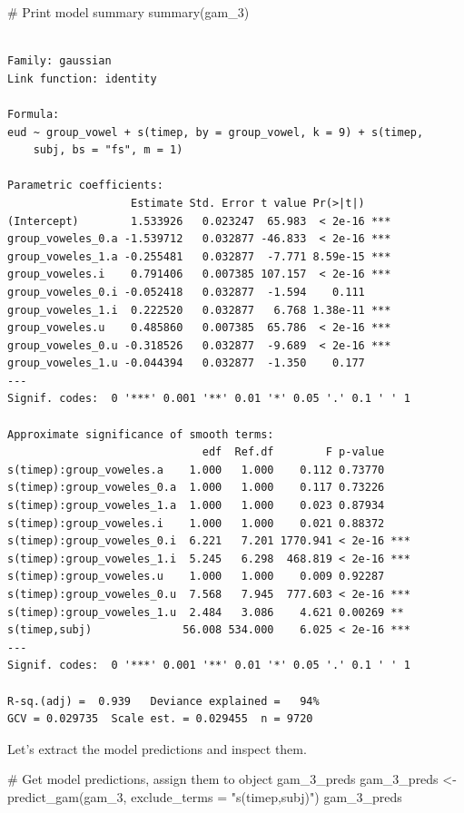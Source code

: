 \documentclass[
  letterpaper,
  DIV=11,
  numbers=noendperiod]{scrartcl}
\newenvironment{Shaded}{\begin{snugshade}}{\end{snugshade}}
\newcommand{\AttributeTok}[1]{\textcolor[rgb]{0.40,0.45,0.13}{#1}}
\newcommand{\CommentTok}[1]{\textcolor[rgb]{0.37,0.37,0.37}{#1}}
\newcommand{\FunctionTok}[1]{\textcolor[rgb]{0.28,0.35,0.67}{#1}}
\newcommand{\NormalTok}[1]{\textcolor[rgb]{0.00,0.23,0.31}{#1}}
\newcommand{\OtherTok}[1]{\textcolor[rgb]{0.00,0.23,0.31}{#1}}
\newcommand{\StringTok}[1]{\textcolor[rgb]{0.13,0.47,0.30}{#1}}
\begin{document}
\begin{Shaded}
\begin{Highlighting}[]
\CommentTok{\# Print model summary}
\FunctionTok{summary}\NormalTok{(gam\_3)}
\end{Highlighting}
\end{Shaded}

\begin{verbatim}

Family: gaussian 
Link function: identity 

Formula:
eud ~ group_vowel + s(timep, by = group_vowel, k = 9) + s(timep, 
    subj, bs = "fs", m = 1)

Parametric coefficients:
                   Estimate Std. Error t value Pr(>|t|)    
(Intercept)        1.533926   0.023247  65.983  < 2e-16 ***
group_voweles_0.a -1.539712   0.032877 -46.833  < 2e-16 ***
group_voweles_1.a -0.255481   0.032877  -7.771 8.59e-15 ***
group_voweles.i    0.791406   0.007385 107.157  < 2e-16 ***
group_voweles_0.i -0.052418   0.032877  -1.594    0.111    
group_voweles_1.i  0.222520   0.032877   6.768 1.38e-11 ***
group_voweles.u    0.485860   0.007385  65.786  < 2e-16 ***
group_voweles_0.u -0.318526   0.032877  -9.689  < 2e-16 ***
group_voweles_1.u -0.044394   0.032877  -1.350    0.177    
---
Signif. codes:  0 '***' 0.001 '**' 0.01 '*' 0.05 '.' 0.1 ' ' 1

Approximate significance of smooth terms:
                              edf  Ref.df        F p-value    
s(timep):group_voweles.a    1.000   1.000    0.112 0.73770    
s(timep):group_voweles_0.a  1.000   1.000    0.117 0.73226    
s(timep):group_voweles_1.a  1.000   1.000    0.023 0.87934    
s(timep):group_voweles.i    1.000   1.000    0.021 0.88372    
s(timep):group_voweles_0.i  6.221   7.201 1770.941 < 2e-16 ***
s(timep):group_voweles_1.i  5.245   6.298  468.819 < 2e-16 ***
s(timep):group_voweles.u    1.000   1.000    0.009 0.92287    
s(timep):group_voweles_0.u  7.568   7.945  777.603 < 2e-16 ***
s(timep):group_voweles_1.u  2.484   3.086    4.621 0.00269 ** 
s(timep,subj)              56.008 534.000    6.025 < 2e-16 ***
---
Signif. codes:  0 '***' 0.001 '**' 0.01 '*' 0.05 '.' 0.1 ' ' 1

R-sq.(adj) =  0.939   Deviance explained =   94%
GCV = 0.029735  Scale est. = 0.029455  n = 9720
\end{verbatim}

Let's extract the model predictions and inspect them.

\begin{Shaded}
\begin{Highlighting}[]
\CommentTok{\# Get model predictions, assign them to object \textquotesingle{}gam\_3\_preds\textquotesingle{}}
\NormalTok{gam\_3\_preds }\OtherTok{\textless{}{-}} \FunctionTok{predict\_gam}\NormalTok{(gam\_3, }\AttributeTok{exclude\_terms =} \StringTok{"s(timep,subj)"}\NormalTok{)}
\NormalTok{gam\_3\_preds}
\end{Highlighting}
\end{Shaded}
\end{document}
